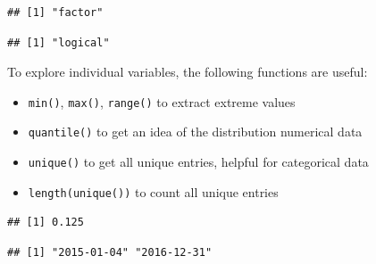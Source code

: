 \documentclass[
]{krantz}
\makeatletter
\newenvironment{Shaded}{\begin{snugshade}}{\end{snugshade}}
\newcommand{\DocumentationTok}[1]{\textcolor[rgb]{0.37,0.37,0.37}{\textbf{\textit{#1}}}}
\newcommand{\FunctionTok}[1]{\textcolor[rgb]{0,0,0}{#1}}
\newcommand{\NormalTok}[1]{#1}
\newcommand{\SpecialCharTok}[1]{\textcolor[rgb]{0,0,0}{#1}}
\providecommand{\tightlist}{%
  \setlength{\itemsep}{0pt}\setlength{\parskip}{0pt}}
\newenvironment{kframe}{%
\medskip{}
\setlength{\fboxsep}{.8em}
 \def\at@end@of@kframe{}%
 \ifinner\ifhmode%
  \def\at@end@of@kframe{\end{minipage}}%
  \begin{minipage}{\columnwidth}%
 \fi\fi%
 \def\FrameCommand##1{\hskip\@totalleftmargin \hskip-\fboxsep
 \colorbox{shadecolor}{##1}\hskip-\fboxsep
     \hskip-\linewidth \hskip-\@totalleftmargin \hskip\columnwidth}%
 \MakeFramed {\advance\hsize-\width
   \@totalleftmargin\z@ \linewidth\hsize
   \@setminipage}}%
 {\par\unskip\endMakeFramed%
 \at@end@of@kframe}
\renewenvironment{Shaded}{\begin{kframe}}{\end{kframe}}
\makeatother
\begin{document}
\begin{verbatim}
## [1] "factor"
\end{verbatim}

\begin{Shaded}
\end{Shaded}

\begin{verbatim}
## [1] "logical"
\end{verbatim}

To explore individual variables, the following functions are useful:

\begin{itemize}
\tightlist
\item
  \texttt{min()}, \texttt{max()}, \texttt{range()} to extract extreme values
\item
  \texttt{quantile()} to get an idea of the distribution numerical data
\item
  \texttt{unique()} to get all unique entries, helpful for categorical data
\item
  \texttt{length(unique())} to count all unique entries
\end{itemize}

\begin{Shaded}
\end{Shaded}

\begin{verbatim}
## [1] 0.125
\end{verbatim}

\begin{Shaded}
\end{Shaded}

\begin{verbatim}
## [1] "2015-01-04" "2016-12-31"
\end{verbatim}

\begin{Shaded}
\end{Shaded}
\end{document}
